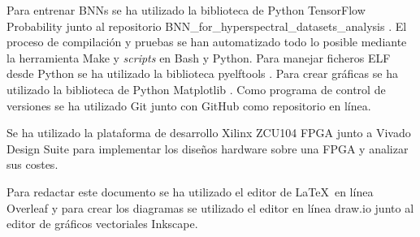 Para entrenar BNNs se ha utilizado la biblioteca de Python TensorFlow Probability \cite{tfprob} junto al repositorio BNN\_for\_hyperspectral\_datasets\_analysis \cite{bnn_hyper_git}. El proceso de compilación y pruebas se han automatizado todo lo posible mediante la herramienta Make y \textit{scripts} en Bash y Python. Para manejar ficheros ELF desde Python se ha utilizado la biblioteca pyelftools \cite{pyelftools}. Para crear gráficas se ha utilizado la biblioteca de Python Matplotlib \cite{matplotlib}. Como programa de control de versiones se ha utilizado Git \cite{git} junto con GitHub como repositorio en línea.

Se ha utilizado la plataforma de desarrollo Xilinx ZCU104 FPGA \cite{fpga_board} junto a Vivado Design Suite \cite{vivado} para implementar los diseños hardware sobre una FPGA y analizar sus costes.

Para redactar este documento se ha utilizado el editor de \LaTeX\ en línea Overleaf \cite{overleaf} y para crear los diagramas se utilizado el editor en línea draw.io \cite{drawio} junto al editor de gráficos vectoriales Inkscape.
